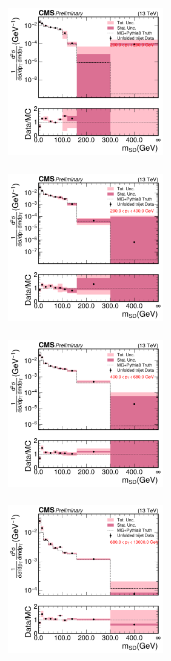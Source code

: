   \begin{figure}[htp!]
    \begin{subfigure}
      \centering
      \includegraphics[width=0.45\textwidth]{figures/multijet/unfolding/trijet/binnedResult_groomed_0.pdf}
    \end{subfigure} 
    \begin{subfigure}
      \centering
      \includegraphics[width=0.45\textwidth]{figures/multijet/unfolding/trijet/binnedResult_groomed_1.pdf}
    \end{subfigure}
    \begin{subfigure}
      \centering
      \includegraphics[width=0.45\textwidth]{figures/multijet/unfolding/trijet/binnedResult_groomed_2.pdf}
    \end{subfigure} 
    \begin{subfigure}
      \centering
      \includegraphics[width=0.45\textwidth]{figures/multijet/unfolding/trijet/binnedResult_groomed_3.pdf}

\end{subfigure}
\end{figure}
